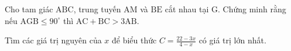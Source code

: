 \begin{bt}
	Cho tam giác $\mathrm{ABC}$, trung tuyến $\mathrm{AM}$ và $\mathrm{BE}$ cắt nhau tại $\mathrm{G}$. Chứng minh rằng nếu $\mathrm{AGB} \leq 90^{\circ}$ thì $\mathrm{AC}+\mathrm{BC}>3 \mathrm{AB}$.
	\loigiai{} 
\end{bt}

\begin{bt}
	Tìm các giá trị nguyên của $x$ để biểu thức $C=\frac{22-3 x}{4-x}$ có giá trị lớn nhất.
	\loigiai{}
\end{bt}

